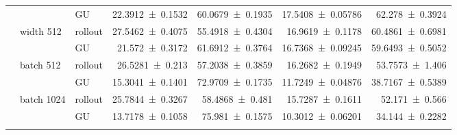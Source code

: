 {\begin{longtable}{@{}lllrrrr@{}}
     &  & GU & \num{22.3912+-0.1532} & \num{60.0679+-0.1935} & \num{17.5408+-0.05786} & \num{62.278+-0.3924} \\
    \addlinespace[2pt]
     & width 512 & rollout & \num{27.5462+-0.4075} & \num{55.4918+-0.4304} & \num{16.9619+-0.1178} & \num{60.4861+-0.6981} \\
     &  & GU & \num{21.572+-0.3172} & \num{61.6912+-0.3764} & \num{16.7368+-0.09245} & \num{59.6493+-0.5052} \\
    \addlinespace[2pt]
     & batch 512 & rollout & \num{26.5281+-0.213} & \num{57.2038+-0.3859} & \num{16.2682+-0.1949} & \num{53.7573+-1.406} \\
     &  & GU & \num{15.3041+-0.1401} & \num{72.9709+-0.1735} & \num{11.7249+-0.04876} & \num{38.7167+-0.5389} \\
    \addlinespace[2pt]
     & batch 1024 & rollout & \num{25.7844+-0.3267} & \num{58.4868+-0.481} & \num{15.7287+-0.1611} & \num{52.171+-0.566} \\
     &  & GU & \num{13.7178+-0.1058} & \num{75.981+-0.1575} & \num{10.3012+-0.06201} & \num{34.144+-0.2282} \\
    \addlinespace[2pt]
  \end{longtable}
}
